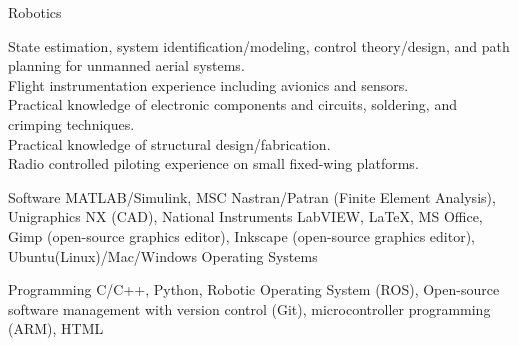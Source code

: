 

\begin{cvskills}

  \cvskill
    {Robotics} %
    {\begin{minipage}[t]{\linewidth}\baselineskip
 		State estimation, system identification/modeling, control theory/design, and path planning for unmanned aerial systems. \\
    		Flight instrumentation experience including avionics and sensors. \\
    		Practical knowledge of electronic components and circuits, soldering, and crimping techniques. \\
    		Practical knowledge of structural design/fabrication. \\
    		Radio controlled piloting experience on small fixed-wing platforms. \end{minipage}}

  \cvskill
    {Software} %
    {MATLAB/Simulink, MSC Nastran/Patran (Finite Element Analysis), Unigraphics NX (CAD), National Instruments LabVIEW, LaTeX, MS Office, Gimp (open-source graphics editor), Inkscape (open-source graphics editor), Ubuntu(Linux)/Mac/Windows Operating Systems} %

  \cvskill
    {Programming} %
    {C/C++, Python, Robotic Operating System (ROS), Open-source software management with version control (Git), microcontroller programming (ARM), HTML} %


\end{cvskills}
